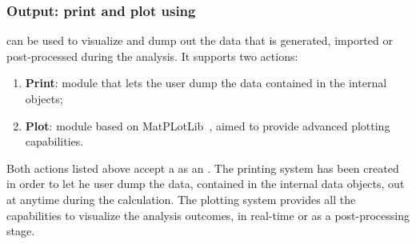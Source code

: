 \subsubsection{Output: print and plot using }
 can be used to visualize and dump out the data that is generated, imported or post-processed during
the analysis. It supports two actions:
\begin{enumerate}
  \item \textbf{Print}: module that lets the user dump the data contained in the internal objects;
  \item \textbf{Plot}: module based on MatPLotLib~\cite{MatPlotLib}, aimed to provide advanced plotting capabilities.
\end{enumerate}
Both actions listed above accept a  as an . The printing system has been created
in order to let he user dump the data, contained in the internal data objects, out at anytime during the calculation.
The plotting system provides all the capabilities to visualize the analysis outcomes, in real-time or as a post-processing
stage.

